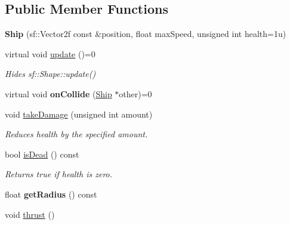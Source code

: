 \subsection*{Public Member Functions}
\begin{DoxyCompactItemize}
\item 
\hypertarget{class_ship_ac33d8bcf838eb988b6050e4e433973d2}{}{\bfseries Ship} (sf\+::\+Vector2f const \&position, float max\+Speed, unsigned int health=1u)\label{class_ship_ac33d8bcf838eb988b6050e4e433973d2}

\item 
\hypertarget{class_ship_abfe8b92e7f0346b198e8c40cff44ebeb}{}virtual void \hyperlink{class_ship_abfe8b92e7f0346b198e8c40cff44ebeb}{update} ()=0\label{class_ship_abfe8b92e7f0346b198e8c40cff44ebeb}

\begin{DoxyCompactList}\small\item\em Hides sf\+::\+Shape\+::update() \end{DoxyCompactList}\item 
\hypertarget{class_ship_a966830e20a179ada7d4b7301577b72d7}{}virtual void {\bfseries on\+Collide} (\hyperlink{class_ship}{Ship} $\ast$other)=0\label{class_ship_a966830e20a179ada7d4b7301577b72d7}

\item 
\hypertarget{class_ship_a3a0732b4bb4697b57398cec3b24d76ed}{}void \hyperlink{class_ship_a3a0732b4bb4697b57398cec3b24d76ed}{take\+Damage} (unsigned int amount)\label{class_ship_a3a0732b4bb4697b57398cec3b24d76ed}

\begin{DoxyCompactList}\small\item\em Reduces health by the specified amount. \end{DoxyCompactList}\item 
\hypertarget{class_ship_a52d219bbadbba6475b919f8e6497ce34}{}bool \hyperlink{class_ship_a52d219bbadbba6475b919f8e6497ce34}{is\+Dead} () const \label{class_ship_a52d219bbadbba6475b919f8e6497ce34}

\begin{DoxyCompactList}\small\item\em Returns true if health is zero. \end{DoxyCompactList}\item 
\hypertarget{class_ship_a67d74d32e2f12fdf11a998cc464c0e2e}{}float {\bfseries get\+Radius} () const \label{class_ship_a67d74d32e2f12fdf11a998cc464c0e2e}

\item 
\hypertarget{class_ship_a4543637a3f0b4275206f684247e1b313}{}void \hyperlink{class_ship_a4543637a3f0b4275206f684247e1b313}{thrust} ()\label{class_ship_a4543637a3f0b4275206f684247e1b313}


\end{DoxyCompactItemize}
